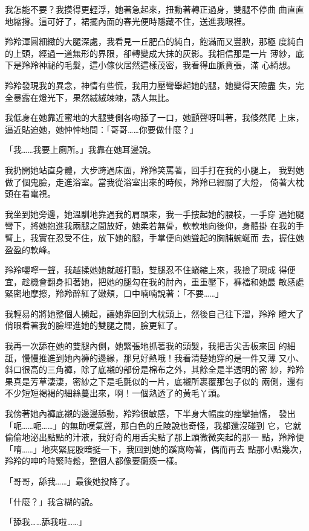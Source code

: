 我怎能不要？我摸得更輕浮，她著急起來，扭動著轉正過身，雙腿不停曲
曲直直地縮撐。這可好了，裙擺內面的春光便時隱藏不住，送進我眼裡。

羚羚渾圓細緻的大腿深處，我看見一丘肥凸的純白，飽滿而又豐腴，那極
度純白的上頭，經過一道無形的界限，卻轉變成大抹的灰影。我相信那是一片
薄紗，底下是羚羚神祕的毛髮，這小傢伙居然這樣茂密，我看得血脈賁張，滿
心綺想。

羚羚發現我的異念，神情有些慌，我用力壓彎舉起她的腿，她變得天險盡
失，完全暴露在燈光下，果然絨絨竦竦，誘人無比。

我低身在她靠近蜜地的大腿雙側各吻舔了一口，她顫聲呀叫著，我倏然爬
上床，逼近貼迫她，她忡忡地問：「哥哥……你要做什麼？」

「我……我要上廁所。」我靠在她耳邊說。

我扔開她站直身體，大步跨過床面，羚羚笑罵著，回手打在我的小腿上，
我對她做了個鬼臉，走進浴室。當我從浴室出來的時候，羚羚已經關了大燈，
倚著大枕頭在看電視。

我坐到她旁邊，她溫馴地靠過我的肩頭來，我一手摟起她的腰枝，一手穿
過她腿彎下，將她抱進我兩腿之間放好，她柔若無骨，軟軟地向後仰，身體掛
在我的手臂上，我實在忍受不住，放下她的腿，手掌便向她聳起的胸脯蜿蜒而
去，握住她盈盈的軟峰。

羚羚嚶嚀一聲，我越揉她她就越打顫，雙腿忍不住蜷縮上來，我撿了現成
得便宜，趁機會翻身扣著她，把她的腿勾在我的肘內，重重壓下，褲襠和她最
敏感處緊密地摩擦，羚羚醉紅了嫩頰，口中喃喃說著：「不要……」

我輕易的將她整個人擄起，讓她靠回到大枕頭上，然後自己往下溜，羚羚
瞪大了俏眼看著我的臉埋進她的雙腿之間，臉更紅了。

我再一次舔在她的雙腿內側，她緊張地抓著我的頭髮，我把舌尖舌板來回
的細舐，慢慢推進到她內褲的邊緣，那兒好熱哦！我看清楚她穿的是一件又薄
又小、斜口很高的三角褲，除了底襯的部份是棉布之外，其餘全是半透明的密
紗，羚羚果真是芳草淒淒，密紗之下是毛氈似的一片，底襯所裹覆那包子似的
兩側，還有不少短短褐褐的細絲蔓出來，啊！一個熟透了的黃毛丫頭。

我傍著她內褲底襯的邊邊舔動，羚羚很敏感，下半身大幅度的痙攣抽慉，
發出「呃……呃……」的無助嘆氣聲，那白色的丘陵說也奇怪，我都還沒碰到
它，它就偷偷地泌出點點的汁液，我好奇的用舌尖點了那上頭微微突起的那一
點，羚羚便「唷……」地夾緊屁股暗挺一下，我回到她的蹊窩吻著，偶而再去
點那小點幾次，羚羚的呻吟時緊時鬆，整個人都像要癱瘓一樣。

「哥哥，舔我……」最後她投降了。

「什麼？」我含糊的說。

「舔我……舔我啦……」

